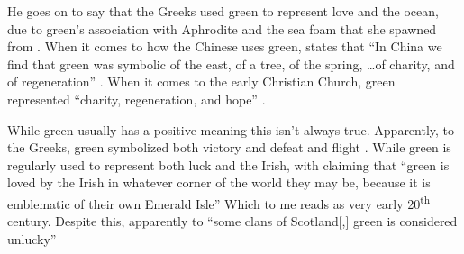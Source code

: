 \documentclass[12pt]{article}
\begin{document}
\begin{doublespace}
             He goes on to say that the Greeks used green to represent love and the ocean, due to green's association with Aphrodite and the sea foam that she spawned from \autocite[140]{colorSymbolism}.
             When it comes to how the Chinese uses green,  states that ``In China we find that green was symbolic of the east, of a tree, of the spring, \dots of charity, and of regeneration'' \autocite[140]{colorSymbolism}. 
             When it comes to the early Christian Church, green represented ``charity, regeneration, and hope'' \autocite[140]{colorSymbolism}. 
        \par While green usually has a positive meaning this isn't always true. Apparently, to the Greeks, green symbolized both victory and defeat and flight \autocite[Evarts 141]{colorSymbolism}. While green is regularly used to represent both luck and the Irish, with \citeauthor*{colorSymbolism} claiming that ``green is loved by the Irish in whatever corner of the world they may be, because it is emblematic of their own Emerald Isle'' \autocite[141]{colorSymbolism} Which to me reads as very early 20\textsuperscript{th} century. Despite this, apparently to ``some clans of Scotland[,] green is considered unlucky'' \autocite[141]{colorSymbolism}

\newpage \printbibliography
\end{doublespace}
\end{document}
